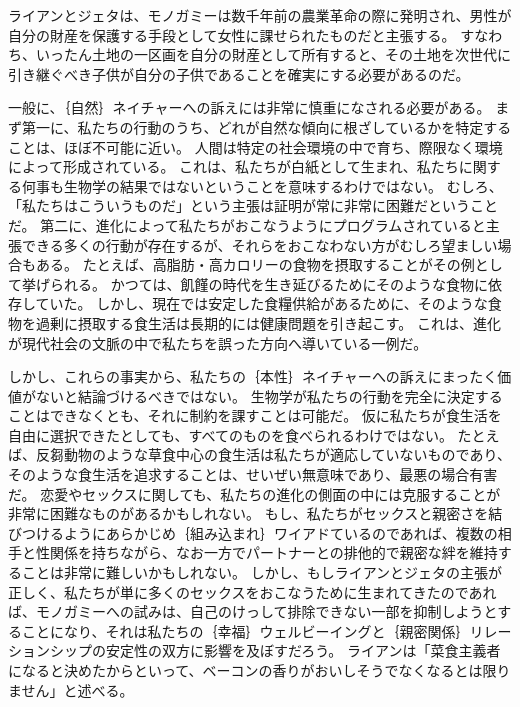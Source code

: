 \documentclass[paper=a4,book,openany]{jlreq}
\begin{document}
ライアンとジェタは、モノガミーは数千年前の農業革命の際に発明され、男性が自分の財産を保護する手段として女性に課せられたものだと主張する。
すなわち、いったん土地の一区画を自分の財産として所有すると、その土地を次世代に引き継ぐべき子供が自分の子供であることを確実にする必要があるのだ。

一般に、｛自然｝{ネイチャー}への訴えには非常に慎重になされる必要がある。
まず第一に、私たちの行動のうち、どれが自然な傾向に根ざしているかを特定することは、ほぼ不可能に近い。
人間は特定の社会環境の中で育ち、際限なく環境によって形成されている。
これは、私たちが白紙として生まれ、私たちに関する何事も生物学の結果ではないということを意味するわけではない。
むしろ、「私たちはこういうものだ」という主張は証明が常に非常に困難だということだ。
第二に、進化によって私たちがおこなうようにプログラムされていると主張できる多くの行動が存在するが、それらをおこなわない方がむしろ望ましい場合もある。
たとえば、高脂肪・高カロリーの食物を摂取することがその例として挙げられる。
かつては、飢饉の時代を生き延びるためにそのような食物に依存していた。
しかし、現在では安定した食糧供給があるために、そのような食物を過剰に摂取する食生活は長期的には健康問題を引き起こす。
これは、進化が現代社会の文脈の中で私たちを誤った方向へ導いている一例だ。

しかし、これらの事実から、私たちの｛本性｝{ネイチャー}への訴えにまったく価値がないと結論づけるべきではない。
生物学が私たちの行動を完全に決定することはできなくとも、それに制約を課すことは可能だ。
仮に私たちが食生活を自由に選択できたとしても、すべてのものを食べられるわけではない。
たとえば、反芻動物のような草食中心の食生活は私たちが適応していないものであり、そのような食生活を追求することは、せいぜい無意味であり、最悪の場合有害だ。
恋愛やセックスに関しても、私たちの進化の側面の中には克服することが非常に困難なものがあるかもしれない。
もし、私たちがセックスと親密さを結びつけるようにあらかじめ｛組み込まれ｝{ワイアド}ているのであれば、複数の相手と性関係を持ちながら、なお一方でパートナーとの排他的で親密な絆を維持することは非常に難しいかもしれない。
しかし、もしライアンとジェタの主張が正しく、私たちが単に多くのセックスをおこなうために生まれてきたのであれば、モノガミーへの試みは、自己のけっして排除できない一部を抑制しようとすることになり、それは私たちの｛幸福｝{ウェルビーイング}と｛親密関係｝{リレーションシップ}の安定性の双方に影響を及ぼすだろう。
ライアンは「菜食主義者になると決めたからといって、ベーコンの香りがおいしそうでなくなるとは限りません」と述べる\citep{bishop10:_ask_chris_ryan_ph}。
\end{document}
